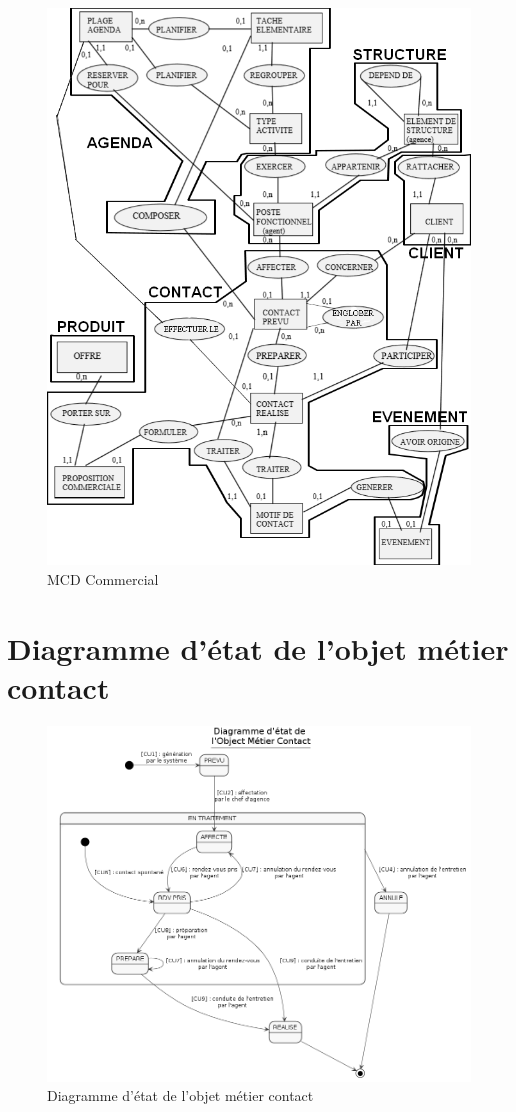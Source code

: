 \begin{figure}[H]
\centering
\includegraphics[width=\textwidth]{figures/mcd/MCD_Commercial}
\caption{MCD Commercial}
\end{figure}

\section{Diagramme d’état de l'objet métier \bf{contact}}

\begin{figure}[H]
\centering
\includegraphics[width=\textwidth]{figures/diag_etats_contact}
\caption{Diagramme d'état de l'objet métier contact}
\end{figure}

